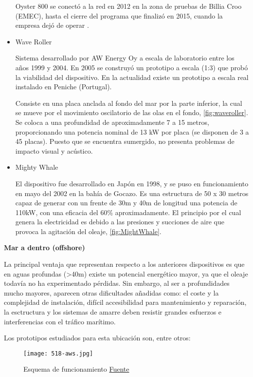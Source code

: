 \begin{itemize}
  Oyster 800 se conectó a la red en 2012 en la zona de pruebas de Billia
  Croo (EMEC), hasta el cierre del programa que finalizó en 2015, cuando
  la empresa dejó de operar \cite{emec15}.


\item
  Wave Roller

  Sistema desarrollado por AW Energy Oy a escala de laboratorio entre
  los años 1999 y 2004. En 2005 se construyó un prototipo a escala (1:3)
  que probó la viabilidad del dispositivo. En la actualidad existe un
  prototipo a escala real instalado en Peniche (Portugal).

  Consiste en una placa anclada al fondo del mar por la parte inferior,
  la cual se mueve por el movimiento oscilatorio de las olas en el
  fondo, \autoref{fig:waveroller}. Se coloca a una profundidad de aproximadamente 7 a 15 metros,
  proporcionando una potencia nominal de 13 kW por placa (se disponen de
  3 a 45 placas). Puesto que se encuentra sumergido, no presenta
  problemas de impacto visual y acústico.



\item
  Mighty Whale

  El dispositivo fue desarrollado en Japón en 1998, y se puso en
  funcionamiento en mayo del 2002 en la bahía de Gocazo. Es una
  estructura de 50 x 30 metros capaz de generar con un frente de 30m y
  40m de longitud una potencia de 110kW, con una eficacia del 60\%
  aproximadamente. El principio por el cual genera la electricidad es
  debido a las presiones y succiones de aire que provoca la agitación
  del oleaje, \autoref{fig:MightWhale}.


\end{itemize}

\textbf{Mar a dentro (offshore)}

La principal ventaja que representan respecto a los anteriores
dispositivos es que en aguas profundas (\textgreater{}40m) existe un
potencial energético mayor, ya que el oleaje todavía no ha experimentado
pérdidas. Sin embargo, al ser a profundidades mucho mayores, aparecen
otras dificultades añadidas como: el coste y la complejidad de
instalación, difícil accesibilidad para mantenimiento y reparación, la
esctructura y los sistemas de amarre deben resistir grandes esfuerzos e
interferencias con el tráfico marítimo.

Los prototipos estudiados para esta ubicación son, entre otros:

\begin{figure}
\centering
\texttt{[image: 518-aws.jpg]}
\caption[Esquema de funcionamiento]{Esquema de funcionamiento \href{www.awsocean.com}{Fuente}}
\label{fig:aws}
\end{figure}

